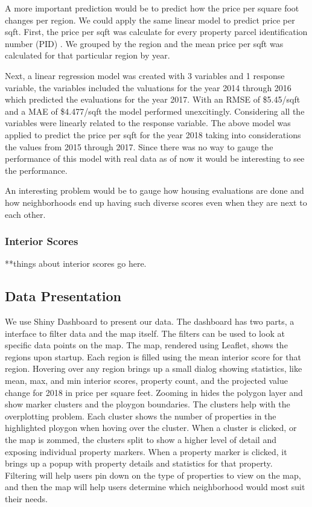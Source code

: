 \documentclass[12pt]{article}
\begin{document}
A more important prediction would be to predict how the price per square 
foot changes per region. We could apply the same linear model to predict 
price per sqft. First, the price per sqft was calculate for every
property parcel identification number (PID) \cite{Property49:online}. We
grouped by the region and the mean price per sqft was calculated for that
particular region by year.

Next, a linear regression model was created with 3 variables and 1 
response variable, the variables included the valuations for the year 
2014 through 2016 which predicted the evaluations for the year 2017. With 
an RMSE of \$5.45/sqft and a MAE of \$4.477/sqft the model performed 
unexcitingly. Considering all the variables were linearly related to the 
response variable. The above model was applied to predict the price per
sqft for the year 2018 taking into considerations the values from 2015
through 2017. Since there was no way to gauge the performance of this
model with real data as of now it would be interesting to see the
performance.

An interesting problem would be to gauge how housing evaluations are done 
and how neighborhoods end up having such diverse scores even when they
are next to each other.

\subsubsection{Interior Scores}

**things about interior scores go here.

\subsection{Data Presentation}
We use Shiny Dashboard to present our data. The dashboard has two parts, 
a interface to filter data and the map itself. The filters can be used to
look at specific data points on the map. 
The map, rendered using Leaflet, shows the regions upon startup. Each region
is filled using the mean interior score for that region. Hovering over any
region brings up a small dialog showing statistics, like mean, max, and min
interior scores, property count, and the projected value change for 2018 in 
price per square feet. Zooming in hides the polygon layer and show marker 
clusters and the ploygon boundaries. The clusters help with the overplotting
problem. Each cluster shows the number of properties in the highlighted ploygon
when hoving over the cluster. When a cluster is clicked, or the map is zommed,
the clusters split to show a higher level of detail and exposing individual
property markers. When a property marker is clicked, it brings up a
popup with property details and statistics for that property. \\
Filtering will help users pin down on the type of properties to view on the 
map, and then the map will help users determine which neighborhood would 
most suit their needs.
\end{document}
